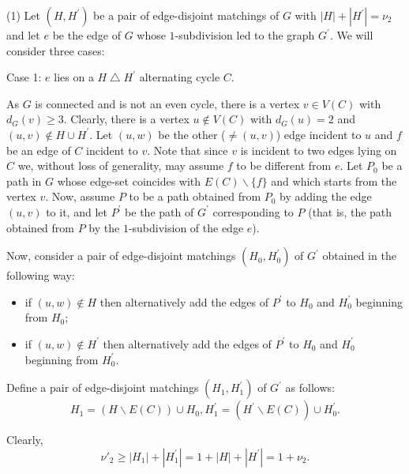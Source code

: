 \documentclass[fleqn,12pt,twoside]{article}
\newenvironment{proof}[1][Proof.]{\begin{trivlist}
\item[\hskip \labelsep {\bfseries #1}]}{\end{trivlist}}
\begin{document}
\begin{proof}
(1) Let $(H,H^{\prime })$ be a pair of edge-disjoint matchings of $G$ with $\left\vert H\right\vert +\left\vert H^{\prime }\right\vert =\nu
_{2}$ and let $e$ be the edge of $G$ whose $1$-subdivision led to
the graph $G^{\prime }$. We will consider three cases:

Case 1: $e$ lies on a $H\bigtriangleup H^{\prime }$ alternating
cycle $C$.

As $G$ is connected and is not an even cycle, there is a
vertex $v\in V(C)$ with $d_{G}(v)\geq 3$. Clearly, there is a vertex $u\notin V(C)$ with $d_{G}(u)=2$ and $(u,v)\notin H\cup H^{\prime }$. Let $(u,w)$ be the other ($\neq (u,v)$) edge incident to $u$ and $f$ be
an edge of $C$ incident to $v$. Note that since $v$ is incident to
two edges lying
on $C$ we, without loss of generality, may assume $f$ to be different from $e $. Let $P_{0}$ be a path in $G$ whose edge-set coincides with $E(C)\backslash \{f\}$ and which starts from the vertex $v$. Now,
assume $P$ to be a path obtained from $P_{0}$ by adding the edge
$(u,v)$ to it, and let $P^{\prime }$ be the path of $G^{\prime }$
corresponding to $P$ (that is, the path obtained from $P$ by the
$1$-subdivision of the edge $e$).

Now, consider a pair of edge-disjoint matchings
$(H_{0},H_{0}^{\prime })$ of $G^{\prime }$ obtained in the following
way:

\begin{itemize}
\item if $(u,w)\notin H$ then alternatively add the edges of $P^{\prime }$
to $H_{0}$ and $H_{0}^{\prime }$ beginning from $H_{0}$;

\item if $(u,w)\notin H^{\prime }$ then alternatively add the edges of $P^{\prime }$ to $H_{0}$ and $H_{0}^{\prime }$ beginning from
$H_{0}^{\prime } $.
\end{itemize}

Define a pair of edge-disjoint matchings $(H_{1},H_{1}^{\prime })$ of $G^{\prime }$ as follows:\begin{equation*}
H_{1}=(H\backslash E(C))\cup H_{0},H_{1}^{\prime }=(H^{\prime
}\backslash E(C))\cup H_{0}^{\prime }.
\end{equation*}

Clearly,
\begin{equation*}
\nu' _{2}\geq \left\vert H_{1}\right\vert +\left\vert H_{1}^{\prime
}\right\vert =1+\left\vert H\right\vert +\left\vert H^{\prime
}\right\vert =1+\nu _{2}.
\end{equation*}


\end{proof}
\end{document}
